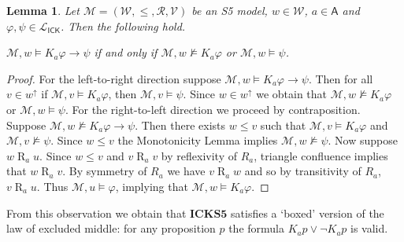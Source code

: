 \documentclass{myifcolog}
\newcommand{\K}{K}
\newcommand\A{\mathsf{A}}
\newcommand{\agi}{a}
\newcommand{\ICK}{\mathsf{ICK}}
\newcommand{\LICK}{\mathcal{L}_{\ICK}}
\newcommand{\fw}{\mathcal{M}}
\newcommand{\Rel}{\mathrel{R}}
\newcommand{\W}{\mathcal{W}}
\newcommand{\rel}{\mathcal{R}}
\newcommand{\V}{\mathcal{V}}
\newtheorem{lemma}[theorem]{Lemma}
\numberwithin{theorem}{section}
\begin{document}
\begin{lemma}\label{l: classical truth conditions for implication}
    Let $\fw=(\W, \leq, \rel, \V)$ be an S5 model, $w \in \W$, $\agi \in \A$ and $\varphi, \psi \in \LICK$. Then the following hold.
    \begin{center}
        $\fw, w \models \K_\agi \varphi \rightarrow \psi$ if and only if $\fw, w \not \models \K_\agi \varphi$ or $\fw, w \models \psi$.
    \end{center}
\end{lemma}
\begin{proof}
    For the left-to-right direction suppose $\fw, w \models \K_\agi \varphi \rightarrow \psi$. Then for all $v \in w^\uparrow$ if $\fw, v \models \K_\agi \varphi$, then $\fw, v \models \psi$. Since $w \in w^\uparrow$ we obtain that $\fw, w \not \models \K_\agi \varphi$ or $\fw, w \models \psi$. For the right-to-left direction we proceed by contraposition. Suppose $\fw, w \not \models \K_\agi \varphi \rightarrow \psi$. Then there exists $w \leq v$ such that $\fw, v \models \K_\agi \varphi$ and $\fw, v \not \models \psi$. Since $w \leq v$ the Monotonicity Lemma implies $\fw, w \not \models \psi$. Now suppose $w \Rel_\agi u$. Since $w \leq v $ and $v \Rel_\agi v$ by reflexivity of $R_\agi$, triangle confluence implies that $w \Rel_\agi v$. By symmetry of $R_\agi$ we have $v \Rel_\agi w$ and so by transitivity of $R_\agi$, $v \Rel_\agi u$. Thus $\fw, u \models \varphi$, implying that $\fw, w \models \K_\agi \varphi$. 
\end{proof}


From this observation  we obtain that $\mathbf{ICKS5}$ satisfies a `boxed' version of the law of excluded middle: for any proposition $p$ the formula $\K_\agi p \vee \neg \K_\agi p$ is valid. 
\end{document}
